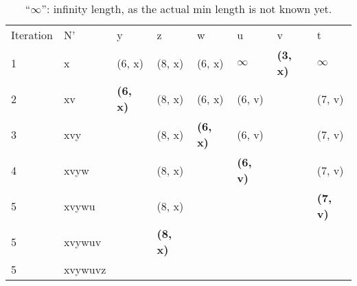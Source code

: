 \begin{table}[H]
      \centering
      \begin{tabular}{llllllll}
            Iteration & N'      & y               & z               & w               & u               & v               & t               \\
            1         & x       & (6, x)          & (8, x)          & (6, x)          & $\infty$        & \textbf{(3, x)} & $\infty$        \\
            2         & xv      & \textbf{(6, x)} & (8, x)          & (6, x)          & (6, v)          &                 & (7, v)          \\
            3         & xvy     &                 & (8, x)          & \textbf{(6, x)} & (6, v)          &                 & (7, v)          \\
            4         & xvyw    &                 & (8, x)          &                 & \textbf{(6, v)} &                 & (7, v)          \\
            5         & xvywu   &                 & (8, x)          &                 &                 &                 & \textbf{(7, v)} \\
            5         & xvywuv  &                 & \textbf{(8, x)} &                 &                 &                 &                 \\
            5         & xvywuvz &                 &                 &                 &                 &                 &                 \\
      \end{tabular}
      \caption{
            ``$\infty$'': infinity length, as the actual min length is not known yet.
      }
\end{table}